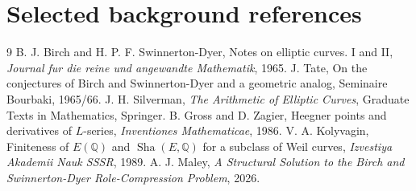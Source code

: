 \documentclass[11pt]{article}
\newcommand{\Q}{\mathbb{Q}}
\newcommand{\Sha}{\operatorname{Sha}}
\begin{document}
\section{Selected background references}
\begin{thebibliography}{9}
 B. J. Birch and H. P. F. Swinnerton-Dyer, Notes on elliptic curves. I and II, \emph{Journal fur die reine und angewandte Mathematik}, 1965.
 J. Tate, On the conjectures of Birch and Swinnerton-Dyer and a geometric analog, Seminaire Bourbaki, 1965/66.
 J. H. Silverman, \emph{The Arithmetic of Elliptic Curves}, Graduate Texts in Mathematics, Springer.
 B. Gross and D. Zagier, Heegner points and derivatives of $L$-series, \emph{Inventiones Mathematicae}, 1986.
 V. A. Kolyvagin, Finiteness of $E(\Q)$ and $\Sha(E,\Q)$ for a subclass of Weil curves, \emph{Izvestiya Akademii Nauk SSSR}, 1989.
 A. J. Maley, \emph{A Structural Solution to the Birch and Swinnerton-Dyer Role-Compression Problem}, 2026.
\end{thebibliography}
\end{document}
